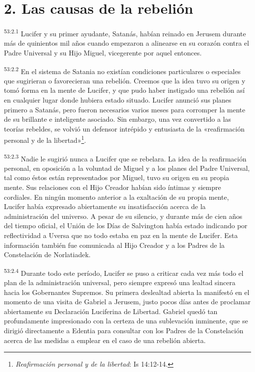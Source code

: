 \section*{2. Las causas de la rebelión}
\par
\textsuperscript{53:2.1} Lucifer y su primer ayudante, Satanás, habían reinado en Jerusem durante más de quinientos mil años cuando empezaron a alinearse en su corazón contra el Padre Universal y su Hijo Miguel, vicegerente por aquel entonces.

\par
\textsuperscript{53:2.2} En el sistema de Satania no existían condiciones particulares o especiales que sugirieran o favorecieran una rebelión. Creemos que la idea tuvo su origen y tomó forma en la mente de Lucifer, y que pudo haber instigado una rebelión así en cualquier lugar donde hubiera estado situado. Lucifer anunció sus planes primero a Satanás, pero fueron necesarios varios meses para corromper la mente de su brillante e inteligente asociado. Sin embargo, una vez convertido a las teorías rebeldes, se volvió un defensor intrépido y entusiasta de la «reafirmación personal y de la libertad»\footnote{\textit{Reafirmación personal y de la libertad}: Is 14:12-14.}.

\par
\textsuperscript{53:2.3} Nadie le sugirió nunca a Lucifer que se rebelara. La idea de la reafirmación personal, en oposición a la voluntad de Miguel y a los planes del Padre Universal, tal como éstos están representados por Miguel, tuvo su origen en su propia mente. Sus relaciones con el Hijo Creador habían sido íntimas y siempre cordiales. En ningún momento anterior a la exaltación de su propia mente, Lucifer había expresado abiertamente su insatisfacción acerca de la administración del universo. A pesar de su silencio, y durante más de cien años del tiempo oficial, el Unión de los Días de Salvington había estado indicando por reflectividad a Uversa que no todo estaba en paz en la mente de Lucifer. Esta información también fue comunicada al Hijo Creador y a los Padres de la Constelación de Norlatiadek.

\par
\textsuperscript{53:2.4} Durante todo este período, Lucifer se puso a criticar cada vez más todo el plan de la administración universal, pero siempre expresó una lealtad sincera hacia los Gobernantes Supremos. Su primera deslealtad abierta la manifestó en el momento de una visita de Gabriel a Jerusem, justo pocos días antes de proclamar abiertamente su Declaración Luciferina de Libertad. Gabriel quedó tan profundamente impresionado con la certeza de una sublevación inminente, que se dirigió directamente a Edentia para consultar con los Padres de la Constelación acerca de las medidas a emplear en el caso de una rebelión abierta.

